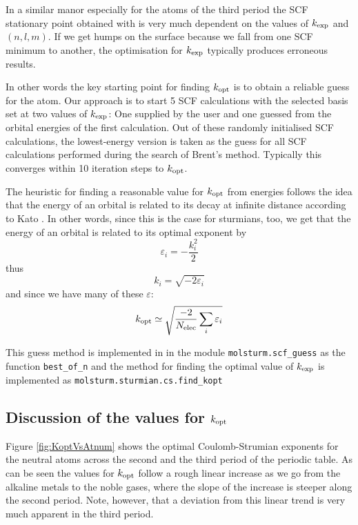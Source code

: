 In a similar manor especially for the atoms of the third
period the SCF stationary point obtained with \molsturm
is very much dependent on the values of $k_\text{exp}$ and $(n,l,m)$.
If we get humps on the surface because we fall from one SCF
minimum to another,
the optimisation for $k_\text{exp}$ typically produces erroneous results.

In other words the key starting point for finding $k_\text{opt}$
is to obtain a reliable guess for the atom.
Our approach is to start 5 SCF calculations with the
selected \CS basis set at two values of $k_\text{exp}$:
One supplied by the user and one guessed from the \HF orbital
energies of the first calculation.
Out of these randomly initialised SCF calculations,
the lowest-energy version is taken as the guess
for all SCF calculations performed during the search
of Brent's method.
Typically this converges within 10 iteration steps
to $k_\text{opt}$.

The heuristic for finding a reasonable value for
$k_\text{opt}$ from \HF energies follows the idea that the
energy of an orbital is related to its decay at infinite distance
according to Kato
.
In other words, since this is the case for sturmians, too,
we get that the energy of an orbital is related to its optimal
exponent by
\[
	\varepsilon_i = -\frac{k_i^2}{2}
\]
thus
\[
	k_i = \sqrt{-2 \varepsilon_i}
\]
and since we have many of these $\varepsilon$:
\[
	k_\text{opt} \simeq \sqrt{\frac{-2}{N_\text{elec}} \sum_i \varepsilon_i}
\]

This guess method is implemented in \molsturm in the
module \texttt{molsturm.scf\_guess}
as the function \texttt{best\_of\_n} and the method
for finding the optimal value of $k_\text{exp}$ is implemented
as \texttt{molsturm.sturmian.cs.find\_kopt}

\subsection{Discussion of the values for $k_\text{opt}$}

Figure \vref{fig:KoptVsAtnum} shows the optimal Coulomb-Strumian exponents
for the neutral atoms across the second and the third period of the periodic table.
As can be seen the values for $k_\text{opt}$ follow a rough linear increase
as we go from the alkaline metals to the noble gases,
where the slope of the increase is steeper along the second period.
Note, however, that a deviation from this linear trend
is very much apparent in the third period.

